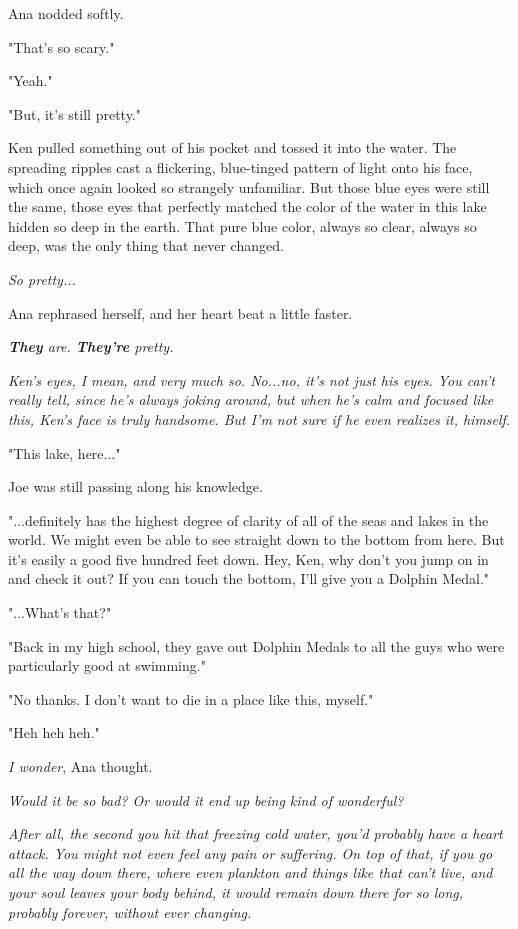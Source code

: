 \documentclass[
]{article}
\begin{document}
Ana nodded softly.

"That's so scary."

"Yeah."

"But, it's still pretty."

Ken pulled something out of his pocket and tossed it into the water. The
spreading ripples cast a flickering, blue-tinged pattern of light onto
his face, which once again looked so strangely unfamiliar. But those
blue eyes were still the same, those eyes that perfectly matched the
color of the water in this lake hidden so deep in the earth. That pure
blue color, always so clear, always so deep, was the only thing that
never changed.

\emph{So pretty...}

Ana rephrased herself, and her heart beat a little faster.

\emph{\textbf{They} are. \textbf{They're} pretty.}

\emph{Ken's eyes, I mean, and very much so. No...no, it's not just his
eyes. You can't really tell, since he's always joking around, but when
he's calm and focused like this, Ken's face is truly handsome. But I'm
not sure if he even realizes it, himself.}

"This lake, here..."

Joe was still passing along his knowledge.

"...definitely has the highest degree of clarity of all of the seas and
lakes in the world. We might even be able to see straight down to the
bottom from here. But it's easily a good five hundred feet down. Hey,
Ken, why don't you jump on in and check it out? If you can touch the
bottom, I'll give you a Dolphin Medal."

"...What's that?"

"Back in my high school, they gave out Dolphin Medals to all the guys
who were particularly good at swimming."

"No thanks. I don't want to die in a place like this, myself."

"Heh heh heh."

\emph{I wonder}, Ana thought.

\emph{Would it be so bad? Or would it end up being kind of wonderful?}

\emph{After all, the second you hit that freezing cold water, you'd
probably have a heart attack. You might not even feel any pain or
suffering. On top of that, if you go all the way down there, where even
plankton and things like that can't live, and your soul leaves your body
behind, it would remain down there for so long, probably forever,
without ever changing.}
\end{document}
